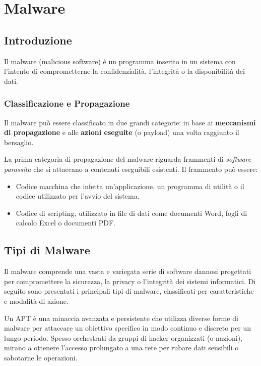 \chapter{Malware}

\section{Introduzione}

\begin{defbox}[Malware]
Il malware (malicious software) è un programma inserito in un sistema con l'intento di comprometterne la confidenzialità, l'integrità o la disponibilità dei dati.
\end{defbox}

\subsection{Classificazione e Propagazione}

Il malware può essere classificato in due grandi categorie: in base ai \textbf{meccanismi di propagazione} e alle \textbf{azioni eseguite} (o payload) una volta raggiunto il bersaglio.

\begin{notebox}
La prima categoria di propagazione del malware riguarda frammenti di \textit{software parassita} che si attaccano a contenuti eseguibili esistenti. Il frammento può essere:
\begin{itemize}
    \item Codice macchina che infetta un'applicazione, un programma di utilità o il codice utilizzato per l'avvio del sistema.
    \item Codice di scripting, utilizzato in file di dati come documenti Word, fogli di calcolo Excel o documenti PDF.
\end{itemize}
\end{notebox}

\section{Tipi di Malware}

Il malware comprende una vasta e variegata serie di software dannosi progettati per compromettere la sicurezza, la privacy o l'integrità dei sistemi informatici. Di seguito sono presentati i principali tipi di malware, classificati per caratteristiche e modalità di azione.

\begin{warnbox}
Un APT è una minaccia avanzata e persistente che utilizza diverse forme di malware per attaccare un obiettivo specifico in modo continuo e discreto per un lungo periodo. Spesso orchestrati da gruppi di hacker organizzati (o nazioni), mirano a ottenere l'accesso prolungato a una rete per rubare dati sensibili o sabotarne le operazioni.
\end{warnbox}

